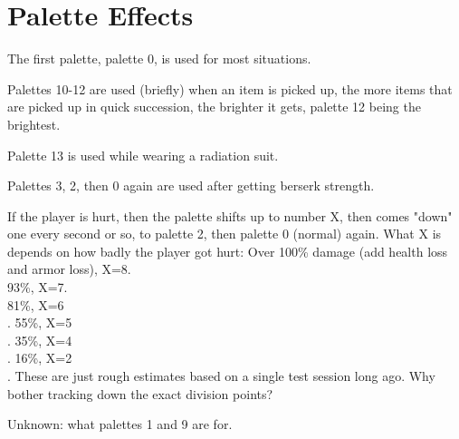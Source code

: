 \section{Palette Effects}
 The first palette, palette 0, is used for most situations.\\ \par
  Palettes 10-12 are used (briefly) when an item is picked up, the
more items that are picked up in quick succession, the brighter it
gets, palette 12 being the brightest. \\ \par
  Palette 13 is used while wearing a radiation suit.\\ \par
  Palettes 3, 2, then 0 again are used after getting berserk strength.

  If the player is hurt, then the palette shifts up to number X, then
comes "down" one every second or so, to palette 2, then palette 0
(normal) again. What X is depends on how badly the player got hurt:
Over 100\% damage (add health loss and armor loss), X=8.\\
93\%, X=7.\\
 81\%, X=6\\
 . 55\%, X=5\\
 . 35\%, X=4\\
 . 16\%, X=2\\
 . These are just rough estimates based on a single test session long ago. Why bother tracking down the exact division points? \\ \par

  Unknown: what palettes 1 and 9 are for.\\ \par
\pagebreak